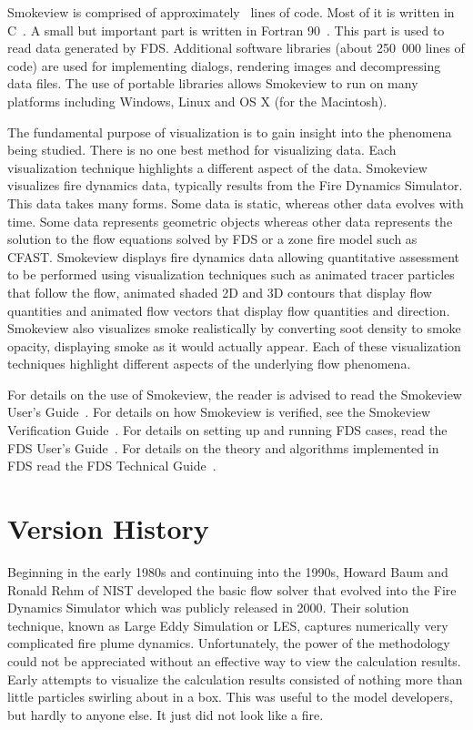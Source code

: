 \documentclass[11pt,twoside]{book}
\begin{document}
Smokeview is comprised of approximately \smvlines\ lines of code.
Most of it is written in C~\cite{C:book}. A small but important
part is written in Fortran 90~\cite{Fortran:book}.  This part is
used to read data generated by FDS.  Additional software libraries
(about 250~000 lines of code) are used for implementing dialogs,
rendering images and decompressing data files. The use of portable
libraries allows Smokeview to run on many platforms including
Windows, Linux and OS X (for the Macintosh).

The fundamental purpose of visualization is to gain insight into
the phenomena being studied. There is no one best method for
visualizing data. Each visualization technique highlights a
different aspect of the data. Smokeview visualizes fire dynamics
data, typically results from the Fire Dynamics Simulator. This
data takes many forms.  Some data is static, whereas other data
evolves with time. Some data represents geometric objects whereas
other data represents the solution to the flow equations solved by
FDS or a zone fire model such as CFAST. Smokeview displays fire
dynamics data allowing quantitative assessment to be performed
using visualization techniques such as animated tracer particles
that follow the flow, animated shaded 2D and 3D contours that
display flow quantities and animated flow vectors that display
flow quantities and direction. Smokeview also visualizes smoke
realistically by converting soot density to smoke opacity,
displaying smoke as it would actually appear. Each of these
visualization techniques highlight different aspects of the
underlying flow phenomena.

For details on the use of Smokeview, the reader is advised to read
the Smokeview User's Guide~\cite{Smokeview_Users_Guide}. For
details on how Smokeview is verified, see the Smokeview
Verification Guide~\cite{Smokeview_Verification_Guide}.  For
details on setting up and running FDS cases, read the FDS User's
Guide~\cite{FDS_Users_Guide}.  For details on the theory and
algorithms implemented in FDS read the FDS Technical
Guide~\cite{FDS_Tech_Guide}.

%
%

\section{Version History}

Beginning in the early 1980s and continuing into the 1990s, Howard
Baum and Ronald Rehm of NIST developed the basic flow solver that
evolved into the Fire Dynamics Simulator which was publicly
released in 2000\cite{McGrattan:6}.  Their solution technique,
known as Large Eddy Simulation or LES, captures numerically very
complicated fire plume dynamics.  Unfortunately, the power of the
methodology could not be appreciated without an effective way to
view the calculation results.  Early attempts to visualize the
calculation results consisted of nothing more than little
particles swirling about in a box.  This was useful to the model
developers, but hardly to anyone else.  It just did not look like
a fire.
\end{document}
